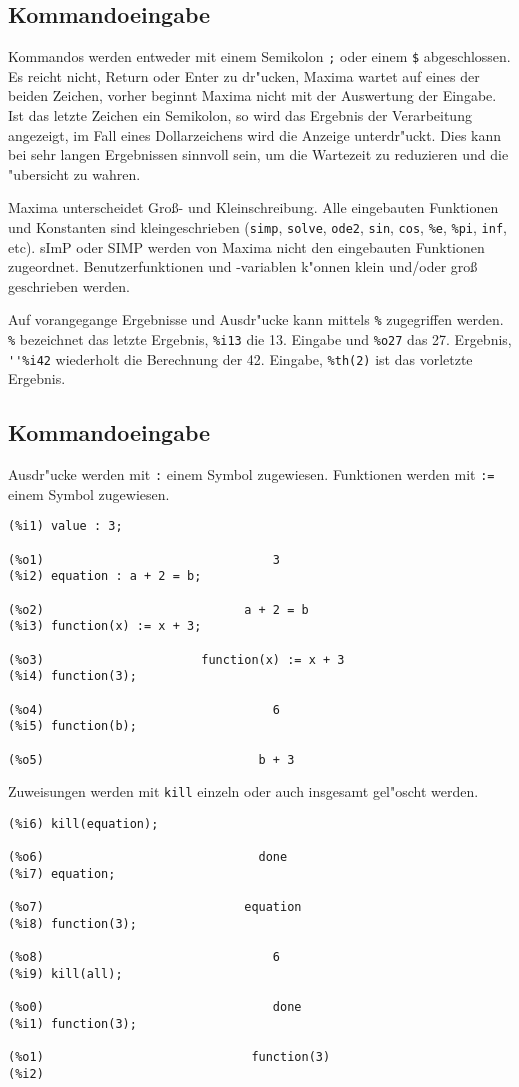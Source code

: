 \documentclass[spanish,12pt,a4paper]{article}
\begin{document}
\subsection{Kommandoeingabe}

Kommandos werden entweder mit einem Semikolon  \verb|;|  oder einem  \verb|$| abgeschlossen. Es reicht nicht, Return oder Enter zu dr"ucken, Maxima wartet auf eines der beiden Zeichen, vorher beginnt Maxima nicht mit der Auswertung der Eingabe. Ist das letzte Zeichen ein Semikolon, so wird das Ergebnis der Verarbeitung angezeigt, im Fall eines Dollarzeichens wird die Anzeige unterdr"uckt. Dies kann bei sehr langen Ergebnissen sinnvoll sein, um die Wartezeit zu reduzieren und die "ubersicht zu wahren.

Maxima unterscheidet Groß- und Kleinschreibung. Alle eingebauten Funktionen und Konstanten sind kleingeschrieben (\verb|simp|, \verb|solve|, \verb|ode2|, \verb|sin|, \verb|cos|, \verb|%e|, \verb|%pi|, \verb|inf|, etc). sImP oder SIMP werden von Maxima nicht den eingebauten Funktionen zugeordnet. Benutzerfunktionen und -variablen k"onnen klein und/oder groß geschrieben werden.

Auf vorangegange Ergebnisse und Ausdr"ucke kann mittels \verb|%| zugegriffen werden. \verb|%| bezeichnet das letzte Ergebnis, \verb|%i13| die 13. Eingabe und \verb|%o27| das 27. Ergebnis, \verb|''%i42| wiederholt die Berechnung der 42. Eingabe, \verb|%th(2)| ist das vorletzte Ergebnis.

\subsection{Kommandoeingabe}

Ausdr"ucke werden mit \verb|:| einem Symbol zugewiesen. Funktionen werden mit \verb|:=| einem Symbol zugewiesen.

\scriptsize
\begin{verbatim}
(%i1) value : 3;

(%o1)                                3
(%i2) equation : a + 2 = b;

(%o2)                            a + 2 = b
(%i3) function(x) := x + 3;

(%o3)                      function(x) := x + 3
(%i4) function(3);

(%o4)                                6
(%i5) function(b);

(%o5)                              b + 3
\end{verbatim}
\normalsize
Zuweisungen werden mit \verb|kill| einzeln oder auch insgesamt gel"oscht werden.
\scriptsize
\begin{verbatim}
(%i6) kill(equation);

(%o6)                              done
(%i7) equation;

(%o7)                            equation
(%i8) function(3);

(%o8)                                6
(%i9) kill(all);

(%o0)                                done
(%i1) function(3);

(%o1)                             function(3)
(%i2) 
\end{verbatim}
\normalsize
\end{document}
